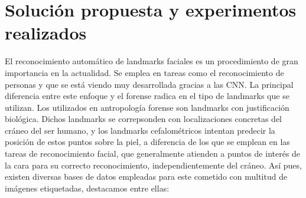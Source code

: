 \chapter{Solución propuesta y experimentos realizados}

    \noindent El reconocimiento automático de landmarks faciales es un procedimiento de gran importancia en la actualidad. Se emplea en tareas como el reconocimiento de personas y que se está viendo muy desarrollada gracias a las CNN. La principal diferencia entre este enfoque y el forense radica en el tipo de landmarks que se utilizan. Los utilizados en antropología forense son landmarks con justificación biológica. Dichos landmarks se correpsonden con localizaciones concretas del cráneo del ser humano, y los landmarks cefalométricos intentan predecir la posición de estos puntos sobre la piel, a diferencia de los que se emplean en las tareas de reconocimiento facial, que generalmente atienden a puntos de interés de la cara para su correcto reconocimiento,  independientemente del cráneo. Así pues, existen diversas bases de datos empleadas para este cometido con multitud de imágenes etiquetadas, destacamos entre ellas: 

